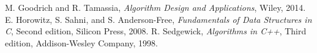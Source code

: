 \documentclass{article}
\begin{document}
%
%
%
%
%
\newpage
\begin{thebibliography}{100}
  M. Goodrich and R. Tamassia, \emph{Algorithm Design and Applications}, Wiley, 2014.
 E. Horowitz, S. Sahni, and S. Anderson-Free, \emph{Fundamentals of Data Structures in C}, Second edition, Silicon Press, 2008. 
  R. Sedgewick, \emph{Algorithms in C++},  Third edition, Addison-Wesley Company, 1998.

 \end{thebibliography}            
\end{document}
